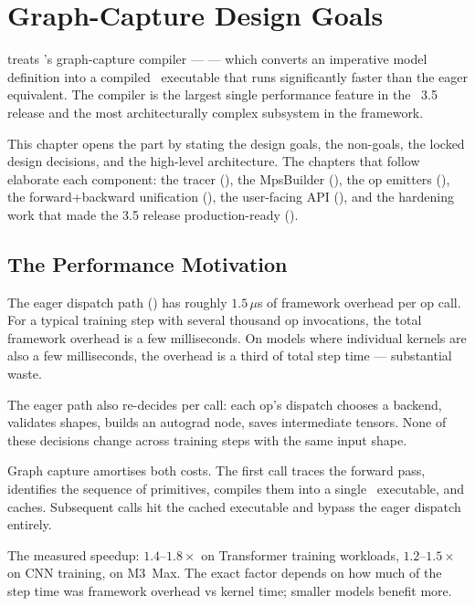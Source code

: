 \chapter{Graph-Capture Design Goals}
\label{ch:compile_design}

 treats \Lucid's graph-capture
compiler ---  --- which converts an
imperative model definition into a compiled \MPSGraph\ executable
that runs significantly faster than the eager equivalent. The
compiler is the largest single performance feature in the
\Lucid\ 3.5 release and the most architecturally complex
subsystem in the framework.

This chapter opens the part by stating the design goals, the
non-goals, the locked design decisions, and the high-level
architecture. The chapters that follow elaborate each component:
the tracer (), the MpsBuilder
(), the op emitters
(), the forward+backward unification
(), the user-facing API
(), and the hardening work that made
the 3.5 release production-ready ().

\section{The Performance Motivation}
\label{sec:compile_design:perf_motivation}

The eager dispatch path () has
roughly $1.5\,\mu$s of framework overhead per op call. For a
typical training step with several thousand op invocations, the
total framework overhead is a few milliseconds. On models where
individual kernels are also a few milliseconds, the overhead is
a third of total step time --- substantial waste.

The eager path also re-decides per call: each op's dispatch
chooses a backend, validates shapes, builds an autograd node,
saves intermediate tensors. None of these decisions change
across training steps with the same input shape.

Graph capture amortises both costs. The first call traces the
forward pass, identifies the sequence of primitives,
compiles them into a single \MPSGraph\ executable, and caches.
Subsequent calls hit the cached executable and bypass the eager
dispatch entirely.

The measured speedup: $1.4$--$1.8\times$ on Transformer training
workloads, $1.2$--$1.5\times$ on CNN training, on M3~Max. The
exact factor depends on how much of the step time was framework
overhead vs kernel time; smaller models benefit more.

